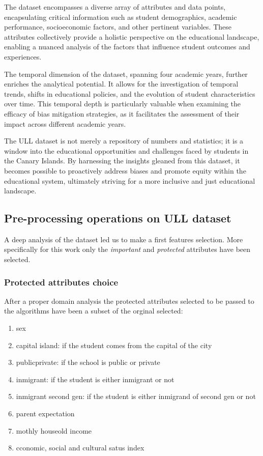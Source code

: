 \documentclass[12pt,a4paper,openright,twoside]{book}
\begin{document}
The dataset encompasses a diverse array of attributes and data points, encapsulating critical information such as student demographics, academic performance, socioeconomic factors, and other pertinent variables. These attributes collectively provide a holistic perspective on the educational landscape, enabling a nuanced analysis of the factors that influence student outcomes and experiences. 

The temporal dimension of the dataset, spanning four academic years, further enriches the analytical potential. It allows for the investigation of temporal trends, shifts in educational policies, and the evolution of student characteristics over time. This temporal depth is particularly valuable when examining the efficacy of bias mitigation strategies, as it facilitates the assessment of their impact across different academic years. 

The ULL dataset is not merely a repository of numbers and statistics; it is a window into the educational opportunities and challenges faced by students in the Canary Islands. By harnessing the insights gleaned from this dataset, it becomes possible to proactively address biases and promote equity within the educational system, ultimately striving for a more inclusive and just educational landscape.

\subsection{Pre-processing operations on ULL dataset}
A deep analysis of the dataset led us to make a first features selection. More specifically for this work only the \emph{important} and \emph{protected} attributes have been selected.
\subsubsection{Protected attributes choice}
After a proper domain analysis the protected attributes selected to be passed to the algorithms have been a subset of the orginal selected:
\begin{enumerate}
    \item sex
    \item capital island: if the student comes from the capital of the city
    \item public\textunderscore private: if the school is public or private
    \item inmigrant: if the student is either inmigrant or not
    \item inmigrant second gen: if the student is either inmigrand of second gen or not
    \item parent expectation
    \item mothly houseold income
    \item cconomic, social and cultural satus index
\end{enumerate}
\end{document}
